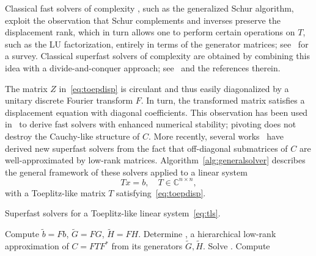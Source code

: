 \documentclass[final,reqno,onefignum,onetabnum]{siamart190516}
\begin{document}
Classical fast solvers of complexity , such as the generalized Schur algorithm, exploit the observation that Schur complements and inverses preserve the displacement rank, which in turn allows one to perform certain operations on $T$, such as the LU factorization, entirely in terms of the generator matrices; see~\cite{kailath1995displacement} for a survey. Classical superfast solvers of complexity  are obtained by combining this idea with a divide-and-conquer approach; see~\cite{Huckle1998} and the references therein.


The matrix $Z$ in~\eqref{eq:toepdisp} is circulant and thus easily diagonalized by a unitary discrete Fourier transform $F$. In turn, the transformed matrix   satisfies a displacement equation with diagonal coefficients. This observation has been used in~\cite{gohberg1995fast} to derive fast solvers with enhanced numerical stability; pivoting does not destroy the Cauchy-like structure of $C$. More recently, several works~\cite{chandrasekaran2007superfast, martinsson2005fast, xia2012superfast} have derived new superfast solvers from the fact that off-diagonal submatrices of $C$ are well-approximated by low-rank matrices. Algorithm~\ref{alg:generalsolver} describes the general framework of these solvers applied to a linear system
\begin{equation}
\label{eq:tls}
Tx = b, \quad T \in \mathbb{C}^{n \times n}, 
\end{equation}
with a Toeplitz-like matrix $T$  satisfying~\eqref{eq:toepdisp}.
\begin{algorithm}[t!]
\caption{Superfast solvers for a Toeplitz-like linear system~\eqref{eq:tls}.}
\label{alg:generalsolver}
\begin{algorithmic}[1]
\State Compute $\widetilde{b} = Fb$, $\widetilde{G} = FG$, $\widetilde{H} = FH$. 
\State Determine , a hierarchical low-rank approximation of $C = FTF^*$ from its generators $\widetilde{G}, \widetilde{H}$. 
\State Solve . 
\State Compute  
\end{algorithmic}
\end{algorithm}
\end{document}
